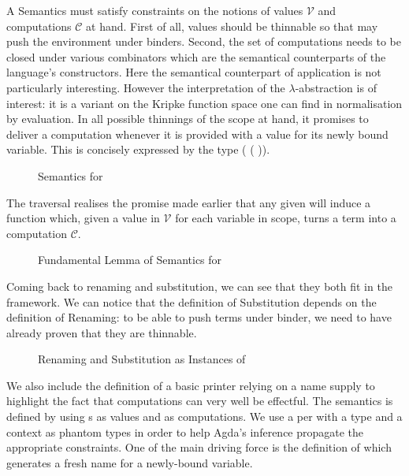 A Semantics must satisfy constraints on the notions of
values $\mathcal{V}$ and computations $\mathcal{C}$ at hand. First of all,
values should be thinnable so that  may push the environment
under binders. Second, the set of computations needs to be closed
under various combinators which are the semantical counterparts of
the language's constructors. Here the semantical counterpart of
application is not particularly interesting. However the interpretation
of the $\lambda$-abstraction is of interest: it is a variant on
the Kripke function space one can find in normalisation by evaluation.
In all possible thinnings of the scope at hand, it promises to deliver
a computation whenever it is provided with a value for its newly
bound variable. This is concisely expressed by the type
( ( \AB{\sigma}   \AB{\tau})).

\begin{figure}[h]
\caption{Semantics for }
\end{figure}

The traversal  realises the promise made earlier that any given
{  } will induce a function which,
given a value in $\mathcal{V}$ for each variable in scope, turns a term
into a computation $\mathcal{C}$.

\begin{figure}[h]
\caption{Fundamental Lemma of Semantics for }
\end{figure}

Coming back to renaming and substitution, we can see that they both fit
in the  framework. We can notice that the definition of Substitution
depends on the definition of Renaming: to be able to push terms under binder, we
need to have already proven that they are thinnable.

\begin{figure}[h]
\begin{minipage}{0.45\textwidth}
\end{minipage}
\begin{minipage}{0.45\textwidth}
\end{minipage}
\caption{Renaming and Substitution as Instances of }
\end{figure}

We also include the definition of a basic printer relying on a
name supply to highlight the fact that computations can very well be
effectful. The  semantics is defined by using s
as values and {  } as computations. We use a
per with a type and a context as phantom types in order to
help Agda's inference propagate the appropriate constraints.
One of the main driving force is the definition of  which
generates a fresh name for a newly-bound variable.

